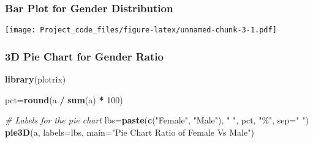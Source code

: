\documentclass[
]{article}
\newenvironment{Shaded}{\begin{snugshade}}{\end{snugshade}}
\newcommand{\AttributeTok}[1]{\textcolor[rgb]{0.13,0.29,0.53}{#1}}
\newcommand{\CommentTok}[1]{\textcolor[rgb]{0.56,0.35,0.01}{\textit{#1}}}
\newcommand{\DecValTok}[1]{\textcolor[rgb]{0.00,0.00,0.81}{#1}}
\newcommand{\FloatTok}[1]{\textcolor[rgb]{0.00,0.00,0.81}{#1}}
\newcommand{\FunctionTok}[1]{\textcolor[rgb]{0.13,0.29,0.53}{\textbf{#1}}}
\newcommand{\NormalTok}[1]{#1}
\newcommand{\OtherTok}[1]{\textcolor[rgb]{0.56,0.35,0.01}{#1}}
\newcommand{\SpecialCharTok}[1]{\textcolor[rgb]{0.81,0.36,0.00}{\textbf{#1}}}
\newcommand{\StringTok}[1]{\textcolor[rgb]{0.31,0.60,0.02}{#1}}
\begin{document}
\subsubsection{Bar Plot for Gender
Distribution}\label{bar-plot-for-gender-distribution}

\begin{Shaded}
\end{Shaded}

\texttt{[image: Project\_code\_files/figure-latex/unnamed-chunk-3-1.pdf]}

\subsubsection{3D Pie Chart for Gender
Ratio}\label{d-pie-chart-for-gender-ratio}

\begin{Shaded}
\begin{Highlighting}[]
\FunctionTok{library}\NormalTok{(plotrix)}

\NormalTok{pct}\OtherTok{=}\FunctionTok{round}\NormalTok{(a }\SpecialCharTok{/} \FunctionTok{sum}\NormalTok{(a) }\SpecialCharTok{*} \DecValTok{100}\NormalTok{)}

\CommentTok{\# Labels for the pie chart}
\NormalTok{lbs}\OtherTok{=}\FunctionTok{paste}\NormalTok{(}\FunctionTok{c}\NormalTok{(}\StringTok{"Female"}\NormalTok{, }\StringTok{"Male"}\NormalTok{), }\StringTok{" "}\NormalTok{, pct, }\StringTok{"\%"}\NormalTok{, }\AttributeTok{sep=}\StringTok{" "}\NormalTok{)}
\FunctionTok{pie3D}\NormalTok{(a, }\AttributeTok{labels=}\NormalTok{lbs, }\AttributeTok{main=}\StringTok{"Pie Chart Ratio of Female Vs Male"}\NormalTok{)}
\end{Highlighting}
\end{Shaded}
\end{document}
